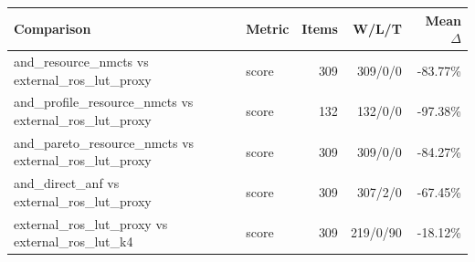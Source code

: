 \begin{tabular}{llrrr}
\toprule
Comparison & Metric & Items & W/L/T & Mean $\Delta$ \\
\midrule
and\_resource\_nmcts vs external\_ros\_lut\_proxy & score & 309 & 309/0/0 & -83.77\% \\
and\_profile\_resource\_nmcts vs external\_ros\_lut\_proxy & score & 132 & 132/0/0 & -97.38\% \\
and\_pareto\_resource\_nmcts vs external\_ros\_lut\_proxy & score & 309 & 309/0/0 & -84.27\% \\
and\_direct\_anf vs external\_ros\_lut\_proxy & score & 309 & 307/2/0 & -67.45\% \\
external\_ros\_lut\_proxy vs external\_ros\_lut\_k4 & score & 309 & 219/0/90 & -18.12\% \\
\bottomrule
\end{tabular}
